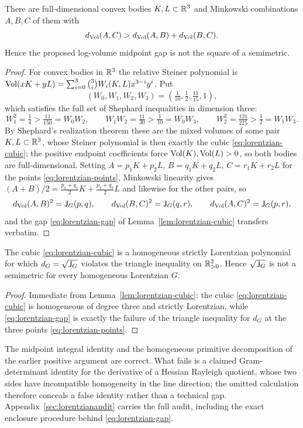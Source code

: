 \begin{cxrefutation}
\begin{theorem}\label{thm:volume-distance}
There are full-dimensional convex bodies $K,L\subset\mathbb R^3$ and Minkowski combinations $A,B,C$ of them with
\[
d_{\operatorname{Vol}}(A,C)>d_{\operatorname{Vol}}(A,B)+d_{\operatorname{Vol}}(B,C).
\]
Hence the proposed log-volume midpoint gap is not the square of a semimetric.
\end{theorem}
\begin{proof}
For convex bodies in $\mathbb R^3$ the relative Steiner polynomial is $\operatorname{Vol}(xK+yL)=\sum_{i=0}^3\binom3iW_i(K,L)x^{3-i}y^i$.  Put
\[
(W_0,W_1,W_2,W_3)=\left(\tfrac1{10},\tfrac12,\tfrac{11}{15},1\right),
\]
which satisfies the full set of Shephard inequalities in dimension three:
\[
W_1^2=\tfrac14>\tfrac{11}{150}=W_0W_2,\qquad
W_1W_2=\tfrac{11}{30}>\tfrac1{10}=W_0W_3,\qquad
W_2^2=\tfrac{121}{225}>\tfrac12=W_1W_3.
\]
By Shephard's realization theorem \citeyearpar[Theorem~4]{Shephard} these are the mixed volumes of some pair $K,L\subset\mathbb R^3$, whose Steiner polynomial is then exactly the cubic \eqref{eq:lorentzian-cubic}; the positive endpoint coefficients force $\operatorname{Vol}(K),\operatorname{Vol}(L)>0$, so both bodies are full-dimensional.  Setting $A=p_1K+p_2L$, $B=q_1K+q_2L$, $C=r_1K+r_2L$ for the points \eqref{eq:lorentzian-points}, Minkowski linearity gives $(A+B)/2=\frac{p_1+q_1}2K+\frac{p_2+q_2}2L$ and likewise for the other pairs, so
\[
d_{\operatorname{Vol}}(A,B)^2=\mathsf{J}_G(p,q),\qquad
d_{\operatorname{Vol}}(B,C)^2=\mathsf{J}_G(q,r),\qquad
d_{\operatorname{Vol}}(A,C)^2=\mathsf{J}_G(p,r),
\]
and the gap \eqref{eq:lorentzian-gap} of Lemma~\ref{lem:lorentzian-cubic} transfers verbatim.
\end{proof}

\begin{corollary}\label{thm:lorentzian}
The cubic \eqref{eq:lorentzian-cubic} is a homogeneous strictly Lorentzian polynomial for which $d_G=\sqrt{\mathsf{J}_G}$ violates the triangle inequality on $\mathbb R_{>0}^2$.  Hence $\sqrt{\mathsf{J}_G}$ is not a semimetric for every homogeneous Lorentzian $G$.
\end{corollary}
\begin{proof}
Immediate from Lemma~\ref{lem:lorentzian-cubic}: the cubic \eqref{eq:lorentzian-cubic} is homogeneous of degree three and strictly Lorentzian, while \eqref{eq:lorentzian-gap} is exactly the failure of the triangle inequality for $d_G$ at the three points \eqref{eq:lorentzian-points}.
\end{proof}

\begin{remark}
The midpoint integral identity and the homogeneous primitive decomposition of the earlier positive argument are correct.  What fails is a claimed Gram-determinant identity for the derivative of a Hessian Rayleigh quotient, whose two sides have incompatible homogeneity in the line direction; the omitted calculation therefore conceals a false identity rather than a technical gap.  Appendix~\ref{sec:lorentzianaudit} carries the full audit, including the exact enclosure procedure behind \eqref{eq:lorentzian-gap}.
\end{remark}
\end{cxrefutation}


